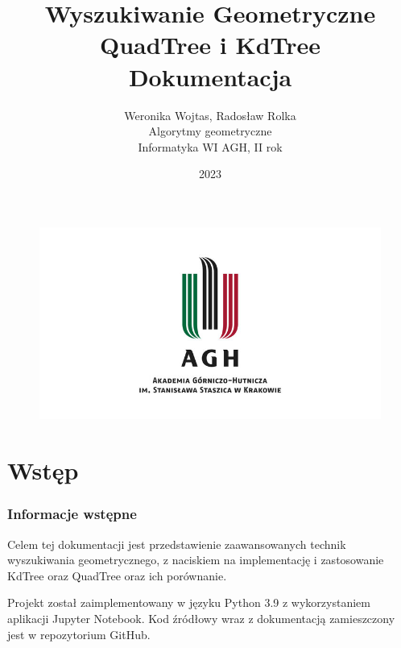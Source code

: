 \documentclass{lab}
\begin{document}
\captionsetup[lstlisting]{labelformat=myformat}

\begin{figure}
    \centering
    \includegraphics{resources/agh.png}
\end{figure}
\title{\Huge \textbf{Wyszukiwanie Geometryczne}\\QuadTree i KdTree \\ \huge Dokumentacja}
\author{Weronika Wojtas, Radosław Rolka\\Algorytmy geometryczne\\Informatyka WI AGH, II rok}
\date{2023}

\maketitle
\newpage
\tableofcontents
\thispagestyle{fancy} 
\newpage

\part{Wstęp}
\section{Informacje wstępne}
Celem tej dokumentacji jest przedstawienie zaawansowanych technik wyszukiwania geometrycznego, z naciskiem na implementację i zastosowanie KdTree oraz QuadTree oraz ich porównanie.

Projekt został zaimplementowany w języku Python 3.9 z wykorzystaniem aplikacji Jupyter Notebook. Kod źródłowy wraz z dokumentacją zamieszczony jest w repozytorium GitHub.
\end{document}
